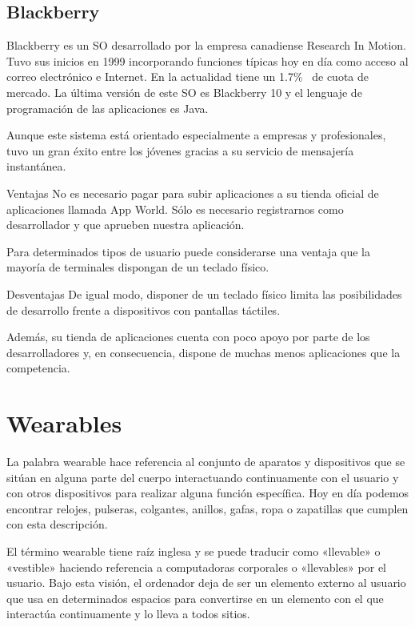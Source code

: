 \subsection{Blackberry}

Blackberry es un \acs{SO} desarrollado por la empresa canadiense Research In Motion. Tuvo sus
inicios en 1999 incorporando funciones típicas hoy en día como acceso al correo electrónico e
Internet. En la actualidad tiene un 1.7\%~\cite{Llamas13} de cuota de mercado. La última versión de
este \acs{SO} es Blackberry 10 y el lenguaje de programación de las aplicaciones es Java.

Aunque este sistema está orientado especialmente a empresas y profesionales, tuvo un gran éxito
entre los jóvenes gracias a su servicio de mensajería instantánea.

\begin{definitionlist}
  \item[Ventajas] No es necesario pagar para subir aplicaciones a su tienda oficial de aplicaciones
    llamada App World. Sólo es necesario registrarnos como desarrollador y que aprueben nuestra
    aplicación.

    Para determinados tipos de usuario puede considerarse una ventaja que la mayoría de terminales
    dispongan de un teclado físico.

  \item[Desventajas] De igual modo, disponer de un teclado físico limita las posibilidades de
    desarrollo frente a dispositivos con pantallas táctiles.

    Además, su tienda de aplicaciones cuenta con poco apoyo por parte de los desarrolladores y, en
    consecuencia, dispone de muchas menos aplicaciones que la competencia.

\end{definitionlist}

\section{Wearables}

La palabra wearable hace referencia al conjunto de aparatos y dispositivos que se sitúan en alguna
parte del cuerpo interactuando continuamente con el usuario y con otros dispositivos para realizar
alguna función específica. Hoy en día podemos encontrar relojes, pulseras, colgantes, anillos,
gafas, ropa o zapatillas que cumplen con esta descripción.

El término wearable tiene raíz inglesa y se puede traducir como «llevable» o «vestible» haciendo
referencia a computadoras corporales o «llevables» por el usuario. Bajo esta visión, el ordenador
deja de ser un elemento externo al usuario que usa en determinados espacios para convertirse en un
elemento con el que interactúa continuamente y lo lleva a todos sitios.

